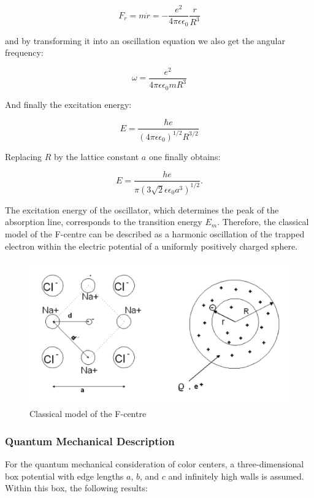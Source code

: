 \documentclass{article}
\begin{document}
\begin{equation*}
    F_r = m \ddot{r}=-\frac{e^2}{4 \pi \epsilon \epsilon_0} \frac{r}{R^3} 
\end{equation*}

and by transforming it into an oscillation equation we also get the angular frequency: 

\begin{equation*}
    \omega=\frac{e^2}{4 \pi \epsilon \epsilon_0 m R^3}
\end{equation*}

And finally the excitation energy: 

\begin{equation*}
    E=\frac{\hbar e}{\left(4 \pi \epsilon \epsilon_0\right)^{1/2} R^{3/2}}
\end{equation*}

Replacing $R$ by the lattice constant $a$ one finally obtains:

\begin{equation*}
    E=\frac{h e}{\pi\left(3 \sqrt{2} \epsilon \epsilon_0 a^3\right)^{1 / 2}} .
\end{equation*}

The excitation energy of the oscillator, which determines the peak of the absorption line, corresponds to the transition energy $E_m$. Therefore, the classical model of the F-centre can be described as a harmonic oscillation of the trapped electron within the electric potential of a uniformly positively charged sphere.

\begin{figure}[h!]
    \centering
    \includegraphics[width=0.3\linewidth]{Figures/Introduction/3.png}
    \caption{Classical model of the F-centre}
    \label{fig:classical}
\end{figure}

\pagebreak{}

\subsubsection{Quantum Mechanical Description}

For the quantum mechanical consideration of color centers, a three-dimensional box potential with edge lengths $a$, $b$, and $c$ and infinitely high walls is assumed. Within this box, the following results:
\end{document}
